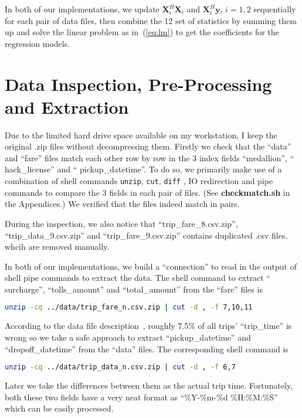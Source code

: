 \documentclass{article}
\begin{document}
In both of our implementations,  we update $\mathbf{X}_i^H\mathbf{X}_i$ and
$\mathbf{X}_i^H\mathbf{y}$, $i=1,2$ sequentially for each pair of data files,
then combine the 12 set of statistics by summing them up and solve the linear
problem as in~(\ref{eq:lm}) to get the coefficients for the regression models.

\section{Data Inspection, Pre-Processing and Extraction}
Due to the limited hard drive space available on my workstation, I keep the
original .zip files without decompressing them. Firstly we check that the
``data'' and ``fare'' files match each other row by row in the 3 index
fields ``medallion'', `` hack\_license'' and `` pickup\_datetime''. To do so, we
primarily make use of a combination of shell commands \texttt{unzip},
\texttt{cut}, \texttt{diff} , IO redirection and pipe commands to compare the 3
fields in each pair of files. (See \textbf{checkmatch.sh} in the Appendices.) We
verified that the files indeed match in pairs.

During the inspection, we also notice that ``trip\_fare\_8.csv.zip'',
``trip\_data\_9.csv.zip'' and ``trip\_fare\_9.csv.zip'' contains duplicated .csv
files, whcih are removed manually.

In both of our implementations, we build a ``connection'' to read in the output
of shell pipe commands to extract the data. The shell command to extract
`` surcharge'', ``tolls\_amount'' and ``total\_amount'' from the ``fare'' files
is
\begin{lstlisting}[language=sh]
    unzip -cq ../data/trip_fare_n.csv.zip | cut -d , -f 7,10,11
\end{lstlisting}

According to the data file description~\cite{work2014new}, roughly 7.5\% of all
trips' ``trip\_time'' is wrong so we take a safe approach to extract
``pickup\_datetime'' and ``dropoff\_datetime'' from the ``data'' files. The
corresponding shell command is
\begin{lstlisting}[language=sh]
    unzip -cq ../data/trip_data_n.csv.zip | cut -d , -f 6,7
\end{lstlisting}

Later we take the differences between them as the actual trip time. Fortunately,
both these two fields have a very neat format as ``\%Y-\%m-\%d \%H:\%M:\%S''
which can be easily processed.
\end{document}
